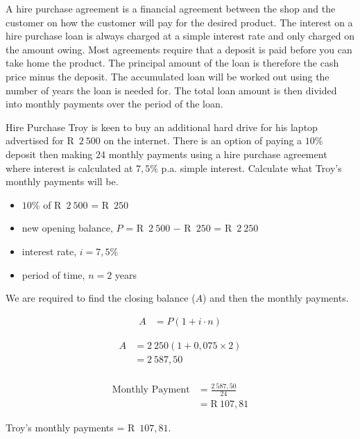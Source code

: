 A hire purchase agreement is a financial agreement between the shop and the customer on how the customer will pay for the desired product. The interest on a hire purchase loan is always charged at a simple interest rate and only charged on the amount owing. Most agreements require that a deposit is paid before you can take home the product. The principal amount of the loan is therefore the cash price minus the deposit. The accumulated loan will be worked out using the number of years the loan is needed for. The total loan amount is then divided into monthly payments over the period of the loan.


\begin{wex}{Hire Purchase}{
    Troy is keen to buy an additional hard drive for his laptop advertised for R~$2~500$ on the internet. There is an option of paying a $10\%$ deposit then making 24 monthly payments using a hire purchase agreement where interest is calculated at $7,5\%$ p.a. simple interest. Calculate what Troy’s monthly payments will be.}{

    \begin{itemize}
	\item $10\%$ of R~$2~500$ = R~$250$\\
	\item new opening balance, $P$ = R~$2~500$ − R~$250$ = R~$2~250$\\
	\item interest rate, $i = 7,5\%$\\
	\item period of time, $n = 2$ years
    \end{itemize}

    We are required to find the closing balance ($A$) and then the monthly payments.

    \begin{align*}
	    A &= P(1 + i \cdot n)
    \end{align*}

    \begin{align*}
	A &= 2~250(1 + 0,075 \times 2)\\
	  &= 2~587,50\\
    \end{align*}

    \begin{align*}
	\text{Monthly Payment} &= \frac{2~587,50}{24}\\
			&= \text{R}~107,81
    \end{align*}

    Troy's monthly payments = R~$107,81$.
}
\end{wex}


